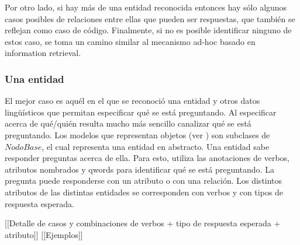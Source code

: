 Por otro lado, si hay más de una entidad reconocida entonces hay sólo algunos casos posibles de relaciones entre ellas que pueden ser respuestas, que también se reflejan como caso de código. Finalmente, si no es posible identificar ninguno de estos caso, se toma un camino similar al mecanismo ad-hoc basado en information retrieval.


\subsubsection*{Una entidad}
El mejor caso es aquél en el que se reconoció una entidad y otros datos lingüísticos que permitan especificar qué se está preguntando. Al especificar acerca de qué/quién resulta mucho más sencillo canalizar qué se está preguntando. Los modelos que representan objetos (ver ) son subclases de $NodoBase$, el cual representa una entidad en abstracto. Una entidad sabe responder preguntas acerca de ella. Para esto, utiliza las anotaciones de verbos, atributos nombrados y qwords para identificar qué se está preguntando. La pregunta puede responderse con un atributo o con una relación. Los distintos atributos de las distintas entidades se corresponden con verbos y con tipos de respuesta esperada. 

[[Detalle de casos y combinaciones de verbos + tipo de respuesta esperada + atributo]]
[[Ejemplos]]

